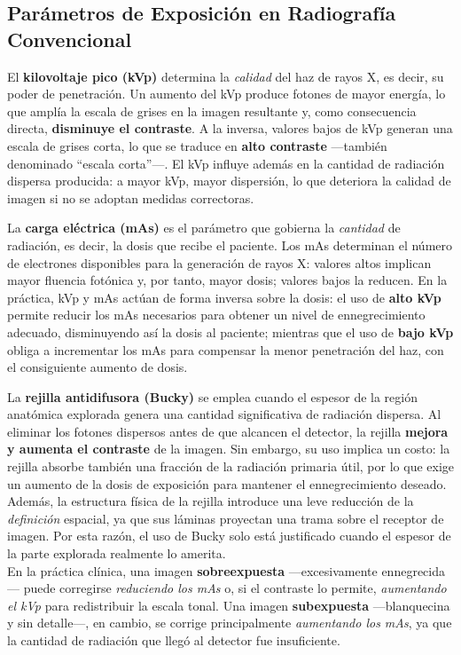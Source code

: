 \subsection*{Parámetros de Exposición en Radiografía Convencional}

El \textbf{kilovoltaje pico (kVp)} determina la \textit{calidad} del haz de rayos X,
es decir, su poder de penetración. Un aumento del kVp produce fotones de mayor energía,
lo que amplía la escala de grises en la imagen resultante y, como consecuencia directa,
\textbf{disminuye el contraste}. A la inversa, valores bajos de kVp generan una escala
de grises corta, lo que se traduce en \textbf{alto contraste} —también denominado
``escala corta''—. El kVp influye además en la cantidad de radiación dispersa producida:
a mayor kVp, mayor dispersión, lo que deteriora la calidad de imagen si no se adoptan
medidas correctoras.

La \textbf{carga eléctrica (mAs)} es el parámetro que gobierna la \textit{cantidad} de
radiación, es decir, la dosis que recibe el paciente. Los mAs determinan el número de
electrones disponibles para la generación de rayos X: valores altos implican mayor
fluencia fotónica y, por tanto, mayor dosis; valores bajos la reducen. En la práctica,
kVp y mAs actúan de forma inversa sobre la dosis: el uso de \textbf{alto kVp} permite
reducir los mAs necesarios para obtener un nivel de ennegrecimiento adecuado,
disminuyendo así la dosis al paciente; mientras que el uso de \textbf{bajo kVp} obliga
a incrementar los mAs para compensar la menor penetración del haz, con el consiguiente
aumento de dosis.

La \textbf{rejilla antidifusora (Bucky)} se emplea cuando el espesor de la región
anatómica explorada genera una cantidad significativa de radiación dispersa. Al eliminar
los fotones dispersos antes de que alcancen el detector, la rejilla \textbf{mejora y
aumenta el contraste} de la imagen. Sin embargo, su uso implica un costo: la rejilla
absorbe también una fracción de la radiación primaria útil, por lo que exige un aumento
de la dosis de exposición para mantener el ennegrecimiento deseado. Además, la estructura
física de la rejilla introduce una leve reducción de la \textit{definición} espacial, ya
que sus láminas proyectan una trama sobre el receptor de imagen. Por esta razón, el uso
de Bucky solo está justificado cuando el espesor de la parte explorada realmente lo
amerita.\\

En la práctica clínica, una imagen \textbf{sobreexpuesta} —excesivamente ennegrecida—
puede corregirse \textit{reduciendo los mAs} o, si el contraste lo permite, \textit{aumentando el kVp}
para redistribuir la escala tonal. Una imagen \textbf{subexpuesta} —blanquecina y sin
detalle—, en cambio, se corrige principalmente \textit{aumentando los mAs}, ya que la cantidad
de radiación que llegó al detector fue insuficiente.

